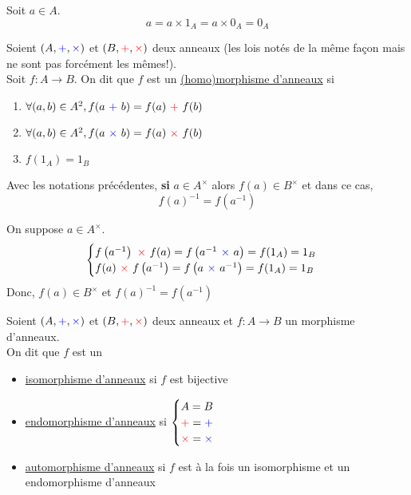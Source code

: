 \begin{prv}
	Soit $a \in A$. \[
		a = a \times 1_A = a \times 0_A = 0_A
	\] 
\end{prv}

\newcommand{\red}[1]{{\color{red} #1}}
\newcommand{\blue}[1]{{\color{blue} #1}}

\begin{defn}
	Soient $(A, \blue+, \blue\times)$ et $(B, \red+, \red\times)$ deux anneaux (les lois notés de la même façon mais ne sont pas forcément les mêmes!).\\
	Soit $f: A \to B$. On dit que $f$ est un \underline{(homo)morphisme d'anneaux} si
	\begin{enumerate}
		\item $\forall (a,b) \in A^2, f(a ~\blue+~ b) = f(a) ~\red+~ f(b)$
		\item $\forall (a,b) \in A^2, f(a ~\blue\times~ b) = f(a) ~\red\times~ f(b)$
		\item $f(1_A) = 1_B$
	\end{enumerate}
\end{defn}

\begin{prop}
	Avec les notations précédentes, {\bf si}  $a \in A^\times$ alors $f(a) \in B^\times$ et dans ce cas,  \[
		f(a)^{-1} = f\left( a^{-1} \right) 
	\] 
\end{prop}

\begin{prv}
	On suppose $a \in A^\times$. \[
	\begin{cases}
		f\left( a^{-1} \right) ~\red\times~ f(a) = f\left( a^{-1} ~\blue\times~ a \right) = f(1_A) = 1_B\\
		f(a) ~\red\times~ f\left( a^{-1} \right)= f\left(a ~\blue\times~  a^{-1} \right) = f(1_A) = 1_B\\
	\end{cases}
	\]
	Donc, $f(a) \in B^\times$ et $f(a)^{-1}= f\left( a^{-1} \right)$
\end{prv}

\begin{defn}
	Soient $(A,\blue+, \blue\times)$ et $(B, \red+, \red\times)$ deux anneaux et $f: A \to B$ un morphisme d'anneaux.\\
	On dit que $f$ est un
	\begin{itemize}
		\item \underline{isomorphisme d'anneaux} si $f$ est bijective
		\item \underline{endomorphisme d'anneaux} si $\begin{cases}
				A = B\\
				\red+ = \blue+\\
				\red\times = \blue\times 
			\end{cases}$ 
		\item \underline{automorphisme d'anneaux} si $f$ est à la fois un isomorphisme et un endomorphisme d'anneaux
	\end{itemize}
\end{defn}

